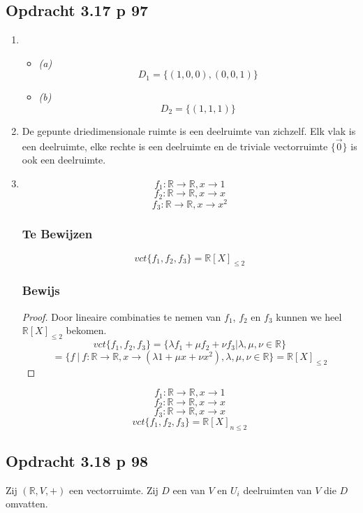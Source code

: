 \documentclass[lineaire_algebra_oplossingen.tex]{subfiles}
\begin{document}
\subsection{Opdracht 3.17 p 97}
\begin{enumerate}
\item
\begin{itemize}
\item \emph{(a)}\\
\[
D_1 = \{(1,0,0),(0,0,1)\}
\]

\item \emph{(b)}\\
\[
D_2 = \{(1,1,1)\}
\]
\end{itemize}

\item De gepunte driedimensionale ruimte is een deelruimte van zichzelf.
Elk vlak is een deelruimte, elke rechte is een deelruimte en de triviale vectorruimte $\{\vec{0}\}$ is ook een deelruimte.

\item
\[
f_1 : \mathbb{R} \rightarrow \mathbb{R}, x \rightarrow 1
\]
\[
f_2 : \mathbb{R} \rightarrow \mathbb{R}, x \rightarrow x
\]
\[
f_3 : \mathbb{R} \rightarrow \mathbb{R}, x \rightarrow x^2
\]
\subsubsection*{Te Bewijzen}
\[
vct\{f_1,f_2,f_3\} = \mathbb{R}[X]_{\le 2}
\]
\subsubsection*{Bewijs}
\begin{proof}
Door lineaire combinaties te nemen van $f_1$, $f_2$ en $f_3$ kunnen we heel $\mathbb{R}[X]_{\le 2}$ bekomen.
\[
vct\{f_1,f_2,f_3\} = \{ \lambda f_1+ \mu f_2 + \nu f_3| \lambda,\mu,\nu \in \mathbb{R}\}
\]
\[ = \{f\ |\ f : \mathbb{R} \rightarrow \mathbb{R}, x \rightarrow (\lambda 1+ \mu x + \nu x^2) ,\lambda,\mu,\nu \in \mathbb{R}\}= \mathbb{R}[X]_{\le 2}
\]
\end{proof}

\[
f_1 : \mathbb{R} \rightarrow \mathbb{R}, x \rightarrow 1
\]
\[
f_2 : \mathbb{R} \rightarrow \mathbb{R}, x \rightarrow x
\]
\[
f_3 : \mathbb{R} \rightarrow \mathbb{R}, x \rightarrow x
\]
\[
vct\{f_1,f_2,f_3\} = \mathbb{R}[X]_{n\le 2}
\]

\end{enumerate}

\subsection{Opdracht 3.18 p 98}
Zij $(\mathbb{R},V,+)$ een vectorruimte. Zij $D$ een  van $V$ en $U_i$ deelruimten van $V$ die $D$ omvatten.
\end{document}
